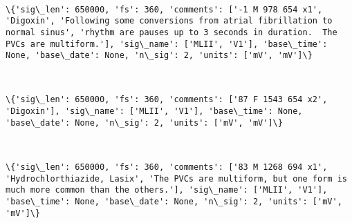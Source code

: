 \documentclass[11pt]{article}
\begin{document}
    \begin{center}
    \end{center}
    { \hspace*{\fill} \\}
    
    \begin{Verbatim}[commandchars=\\\{\}]
\{'sig\_len': 650000, 'fs': 360, 'comments': ['-1 M 978 654 x1', 'Digoxin', 'Following some conversions from atrial fibrillation to normal sinus', 'rhythm are pauses up to 3 seconds in duration.  The PVCs are multiform.'], 'sig\_name': ['MLII', 'V1'], 'base\_time': None, 'base\_date': None, 'n\_sig': 2, 'units': ['mV', 'mV']\}

    \end{Verbatim}

    \begin{center}
    \end{center}
    { \hspace*{\fill} \\}
    
    \begin{Verbatim}[commandchars=\\\{\}]
\{'sig\_len': 650000, 'fs': 360, 'comments': ['87 F 1543 654 x2', 'Digoxin'], 'sig\_name': ['MLII', 'V1'], 'base\_time': None, 'base\_date': None, 'n\_sig': 2, 'units': ['mV', 'mV']\}

    \end{Verbatim}

    \begin{center}
    \end{center}
    { \hspace*{\fill} \\}
    
    \begin{Verbatim}[commandchars=\\\{\}]
\{'sig\_len': 650000, 'fs': 360, 'comments': ['83 M 1268 694 x1', 'Hydrochlorthiazide, Lasix', 'The PVCs are multiform, but one form is much more common than the others.'], 'sig\_name': ['MLII', 'V1'], 'base\_time': None, 'base\_date': None, 'n\_sig': 2, 'units': ['mV', 'mV']\}

    \end{Verbatim}
\end{document}

